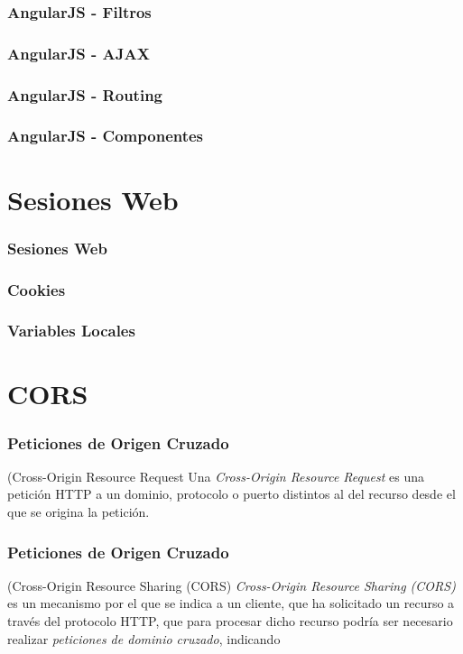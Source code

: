 \documentclass[a4paper,slidestop,xcolor=pst,blue]{beamer}
\begin{document}
\begin{frame}[c]
    \frametitle{AngularJS - Filtros}
\end{frame}

\begin{frame}[c]
    \frametitle{AngularJS - AJAX}
\end{frame}

\begin{frame}[c]
    \frametitle{AngularJS - Routing}
\end{frame}

\begin{frame}[c]
    \frametitle{AngularJS - Componentes}
\end{frame}

\section{Sesiones Web}

\begin{frame}[c]
    \frametitle{Sesiones Web}
\end{frame}

\begin{frame}[c]
    \frametitle{Cookies}
\end{frame}

\begin{frame}[c]
    \frametitle{Variables Locales}
\end{frame}

\section{CORS}

\begin{frame}[c]
    \frametitle{Peticiones de Origen Cruzado}
    \begin{block}{(Cross-Origin Resource Request}
         Una \alert{\emph{Cross-Origin Resource Request}} es una petición HTTP a un dominio, protocolo o puerto distintos al del recurso desde el que se origina la petición.
    \end{block}
\end{frame}    

\begin{frame}[c]
    \frametitle{Peticiones de Origen Cruzado}
    \begin{block}{(Cross-Origin Resource Sharing (CORS)}
        \alert{\emph{Cross-Origin Resource Sharing (CORS)}} es un mecanismo por el que 
        se indica a un cliente, que ha solicitado un recurso a través del protocolo HTTP, que para procesar dicho recurso podría ser necesario realizar \emph{peticiones de dominio cruzado}, indicando
    \end{block}
\end{frame}
\end{document}
